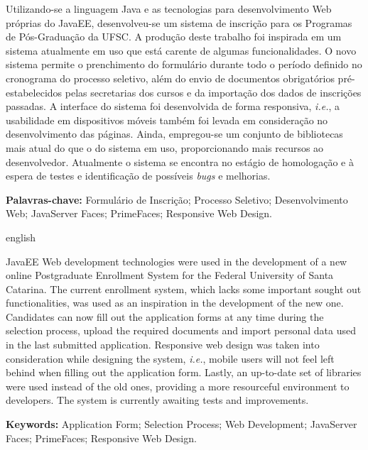 \documentclass[
  10.5pt,				  %
	openright,			%
	twoside,			  %
  a5paper,
  chapter=TITLE,	%
	section=TITLE,	%
  hyphens,        %
	english,        %
	brazil          %
]{abntex2}
\begin{document}
 
\begin{resumo}

Utilizando-se a linguagem Java e as tecnologias para desenvolvimento Web próprias do JavaEE, desenvolveu-se um sistema de inscrição para os Programas de Pós-Graduação da UFSC. A produção deste trabalho foi inspirada em um sistema atualmente em uso que está carente de algumas funcionalidades. O novo sistema permite o prenchimento do formulário durante todo o período definido no cronograma do processo seletivo, além do envio de documentos obrigatórios pré-estabelecidos pelas secretarias dos cursos e da importação dos dados de inscrições passadas. A interface do sistema foi desenvolvida de forma responsiva, \emph{i.e.}, a usabilidade em dispositivos móveis também foi levada em consideração no desenvolvimento das páginas. Ainda, empregou-se um conjunto de bibliotecas mais atual do que o do sistema em uso, proporcionando mais recursos ao desenvolvedor. Atualmente o sistema se encontra no estágio de homologação e à espera de testes e identificação de possíveis \emph{bugs} e melhorias.

\vspace{\onelineskip}
\noindent \textbf{Palavras-chave:} Formulário de Inscrição; Processo Seletivo; Desenvolvimento Web; JavaServer Faces; PrimeFaces; Responsive Web Design.
\end{resumo}
\begin{resumo}[Abstract]
\begin{otherlanguage*}{english}

JavaEE Web development technologies were used in the development of a new online Postgraduate Enrollment System for the Federal University of Santa Catarina. The current enrollment system, which lacks some important sought out functionalities, was used as an inspiration in the development of the new one. Candidates can now fill out the application forms at any time during the selection process, upload the required documents and import personal data used in the last submitted application. Responsive web design was taken into consideration while designing the system, \emph{i.e.}, mobile users will not feel left behind when filling out the application form. Lastly, an up-to-date set of libraries were used instead of the old ones, providing a more resourceful environment to developers. The system is currently awaiting tests and improvements.

\vspace{\onelineskip}
\noindent \textbf{Keywords:} Application Form; Selection Process; Web Development; JavaServer Faces; PrimeFaces; Responsive Web Design.
\end{otherlanguage*}
\end{resumo}
\end{document}
